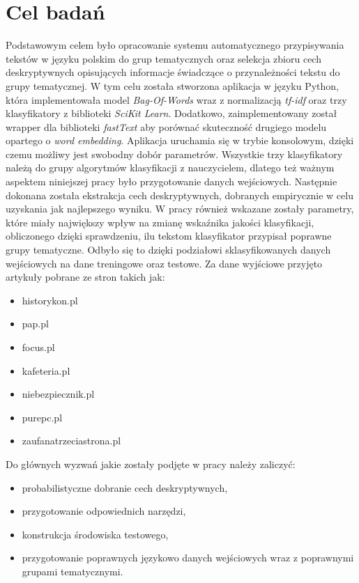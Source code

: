 \section{Cel badań}
Podstawowym celem było opracowanie systemu automatycznego przypisywania tekstów w języku polskim do grup tematycznych oraz selekcja zbioru cech deskryptywnych opisujących informacje świadczące o przynależności tekstu do grupy tematycznej. W tym celu została stworzona aplikacja w języku Python, która implementowała model \textit{Bag-Of-Words} wraz z normalizacją \textit{tf-idf} oraz trzy klasyfikatory z biblioteki \textit{SciKit Learn}. Dodatkowo, zaimplementowany został wrapper dla biblioteki \textit{fastText} aby porównać skuteczność drugiego modelu opartego o \textit{word embedding}. Aplikacja uruchamia się w trybie konsolowym, dzięki czemu możliwy jest swobodny dobór parametrów. Wszystkie trzy klasyfikatory należą do grupy algorytmów klasyfikacji z nauczycielem, dlatego też ważnym aspektem niniejszej pracy było przygotowanie danych wejściowych. Następnie dokonana została ekstrakcja cech deskryptywnych, dobranych empirycznie w celu uzyskania jak najlepszego wyniku. W pracy również wskazane zostały parametry, które miały największy wpływ na zmianę wskaźnika jakości klasyfikacji, obliczonego dzięki sprawdzeniu, ilu tekstom klasyfikator przypisał poprawne grupy tematyczne. Odbyło się to dzięki podziałowi sklasyfikowanych danych wejściowych na dane treningowe oraz testowe. Za dane wyjściowe przyjęto artykuły pobrane ze stron takich jak: 
\begin{itemize}
\item historykon.pl
\item pap.pl
\item focus.pl
\item kafeteria.pl
\item niebezpiecznik.pl
\item purepc.pl
\item zaufanatrzeciastrona.pl
\end{itemize}

Do głównych wyzwań jakie zostały podjęte w pracy należy zaliczyć:
\begin{itemize}
\item probabilistyczne dobranie cech deskryptywnych,
\item przygotowanie odpowiednich narzędzi,
\item konstrukcja środowiska testowego,
\item przygotowanie poprawnych językowo danych wejściowych wraz z poprawnymi grupami tematycznymi.
\end{itemize}


